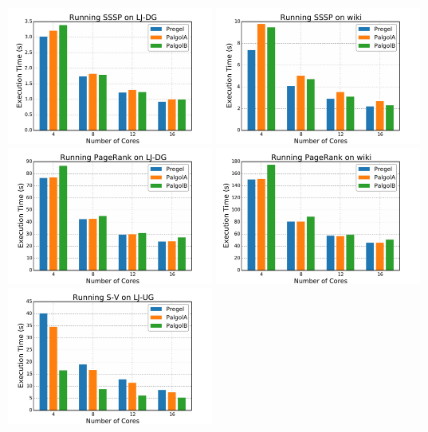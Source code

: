 \documentclass{sokendai_thesis} %
\begin{document}
\begin{figure}
\centering
\includegraphics[width=0.48\textwidth]{plot/exec_sssp_LJ-DG.pdf}
\includegraphics[width=0.48\textwidth]{plot/exec_sssp_wiki.pdf}
\\
\includegraphics[width=0.48\textwidth]{plot/exec_pagerank_LJ-DG.pdf}
\includegraphics[width=0.48\textwidth]{plot/exec_pagerank_wiki.pdf}
\\
\includegraphics[width=0.48\textwidth]{plot/exec_svppa_LJ-UG.pdf}

\end{figure}
\end{document}
